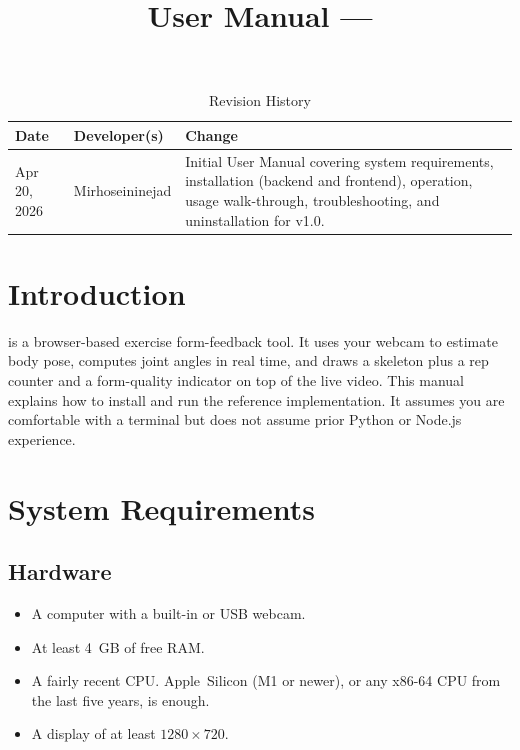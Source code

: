 \documentclass{article}
\title{User Manual --- \progname}
\author{\authname}
\date{}
\begin{document}
\maketitle

\begin{table}[hp]
\caption{Revision History} \label{TblRevisionHistory}
\begin{tabularx}{\textwidth}{llX}
\toprule
\textbf{Date} & \textbf{Developer(s)} & \textbf{Change}\\
\midrule
Apr 20, 2026 & Mirhoseininejad & Initial User Manual covering system
requirements, installation (backend and frontend), operation, usage
walk-through, troubleshooting, and uninstallation for \progname{}
v1.0.\\
\bottomrule
\end{tabularx}
\end{table}

\newpage

\tableofcontents

\newpage

\section{Introduction}

\progname{} is a browser-based exercise form-feedback tool. It uses
your webcam to estimate body pose, computes joint angles in real time,
and draws a skeleton plus a rep counter and a form-quality indicator
on top of the live video. This manual explains how to install and run
the reference implementation. It assumes you are comfortable with a
terminal but does not assume prior Python or Node.js experience.

\section{System Requirements}

\subsection{Hardware}

\begin{itemize}
  \item A computer with a built-in or USB webcam.
  \item At least 4~GB of free RAM.
  \item A fairly recent CPU. Apple~Silicon (M1 or newer), or any
    x86-64 CPU from the last five years, is enough.
  \item A display of at least $1280\times720$.
\end{itemize}
\end{document}
